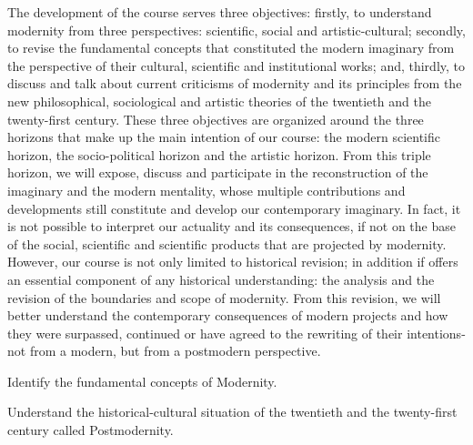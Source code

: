 \begin{syllabus}


\begin{justification}
The development of the course serves three objectives: firstly, to understand modernity from three perspectives: scientific, social and artistic-cultural; secondly, to revise the fundamental concepts that constituted the modern imaginary from the perspective of their cultural, scientific and institutional works; and, thirdly, to discuss and talk about
current criticisms of modernity and its principles from the new philosophical, sociological and artistic theories of the twentieth and the twenty-first century. These three objectives are organized around the three horizons that make up the main intention of our course: the modern scientific horizon, the socio-political horizon and the artistic horizon. From this triple horizon, we will expose, discuss and participate in the reconstruction of the imaginary and the modern mentality, whose multiple contributions
and developments still constitute and develop our contemporary imaginary. In fact, it is not possible to interpret our actuality and its consequences, if not on the base of the social, scientific and scientific products that are projected by modernity. However, our course is not only limited to historical revision; in addition if offers an essential
component of any historical understanding: the analysis and the revision of the boundaries and scope of modernity. From this revision, we will better understand the contemporary consequences of modern projects and how they were surpassed, continued or have agreed to the rewriting of their intentions- not from a modern, but from a postmodern perspective.
\end{justification}

\begin{goals}
\item Identify the fundamental concepts of Modernity.
\item Understand the historical-cultural situation of the twentieth and the twenty-first century called Postmodernity.
\end{goals}

\begin{outcomes}
    \item {} %
    \item {} %
    \item {} %
    \item {} %
    \item {} %
\end{outcomes}


\end{syllabus}
